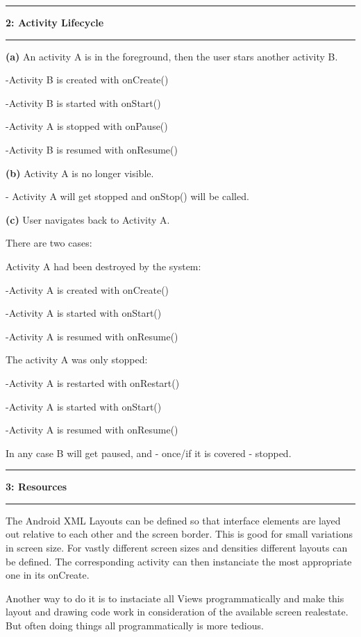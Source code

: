 \documentclass[11pt]{article}
\newcommand\question[2]{\vspace{.25in}\hrule\textbf{#1: #2}\vspace{.5em}\hrule\vspace{.10in}}
\renewcommand\part[1]{\vspace{.10in}\textbf{(#1)}}
\begin{document}
\question{2}{Activity Lifecycle} 
\part{a} An activity A is in the foreground, then the user stars another activity B.
 
 -Activity B is created with onCreate()
 
 -Activity B is started with onStart()
 
 -Activity A is stopped with onPause()
 
 -Activity B is resumed with onResume()

\part{b} Activity A is no longer visible.

- Activity A will get stopped and onStop() will be called.

\part{c} User navigates back to Activity A.

There are two cases:

Activity A had been destroyed by the system:

-Activity A is created with onCreate()

-Activity A is started with onStart()

-Activity A is resumed with onResume()

The activity A was only stopped:

-Activity A is restarted with onRestart()

-Activity A is started with onStart()

-Activity A is resumed with onResume()

In any case B will get paused, and  - once/if it is covered - stopped.

\question{3}{Resources}

The Android XML Layouts can be defined so that interface elements are layed out relative to each other and the screen border. This is good for small variations in screen size. For vastly different screen sizes and densities different layouts can be defined. The corresponding activity can then instanciate the most appropriate one in its onCreate.

Another way to do it is to instaciate all Views programmatically and make this layout and drawing code work in consideration of the available screen realestate. But often doing things all programmatically is more tedious.
\end{document}
